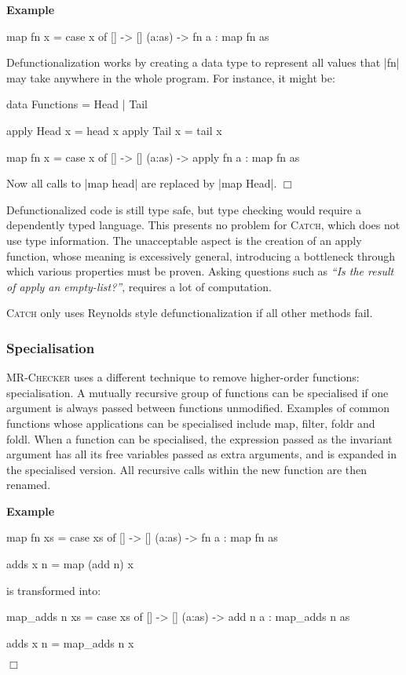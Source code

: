 \documentclass[preprint]{sigplanconf}
\newcommand{\C}[1]{\textsf{#1}}
\newcommand{\catch}{\textsc{Catch}}
\newcommand{\oldtool}{\anon{\catch05}{\textsc{MR-Checker}}}
\newcounter{exmp}
\newcommand{\yesexample}{\addtocounter{exmp}{1}\addvspace{2mm}\noindent\textbf{Example \arabic{exmp}}}
\newcommand{\noexample}{\hfill\ensuremath{\Box}\par\addvspace{2mm}}
\newcommand{\anon}[2]{#2}
\newenvironment{example}{\yesexample}{\noexample}
\begin{document}
\begin{example}
\begin{code}
map fn x = case  x of
                 []      -> []
                 (a:as)  -> fn a : map fn as
\end{code}

\noindent Defunctionalization works by creating a data type to represent all values that |fn| may take anywhere in the whole program. For instance, it might be:

\begin{code}
data Functions = Head | Tail

apply Head  x = head  x
apply Tail  x = tail  x

map fn x = case  x of
                 []      -> []
                 (a:as)  -> apply fn a : map fn as
\end{code}

\noindent Now all calls to |map head| are replaced by |map Head|.
\end{example}

Defunctionalized code is still type safe, but type checking would require a dependently typed language. This presents no problem for \catch{}, which does not use type information. The unacceptable aspect is the creation of an \C{apply} function, whose meaning is excessively general, introducing a bottleneck through which various properties must be proven. Asking questions such as \textit{``Is the result of \C{apply} an empty-list?''}, requires a lot of computation.

\catch{} only uses Reynolds style defunctionalization if all other methods fail.


\subsubsection{Specialisation}

\oldtool{} uses a different technique to remove higher-order functions: specialisation. A mutually recursive group of functions can be specialised if one argument is always passed between functions unmodified. Examples of common functions whose applications can be specialised include \C{map}, \C{filter}, \C{foldr} and \C{foldl}. When a function can be specialised, the expression passed as the invariant argument has all its free variables passed as extra arguments, and is expanded in the specialised version. All recursive calls within the new function are then renamed.

\begin{example}
\begin{code}
map fn xs = case  xs of
                  []      -> []
                  (a:as)  -> fn a : map fn as

adds x n = map (add n) x
\end{code}

\noindent is transformed into:

\begin{code}
map_adds n xs = case  xs of
                      []      -> []
                      (a:as)  -> add n a : map_adds n as

adds x n = map_adds n x
\end{code}
\end{example}
\end{document}
